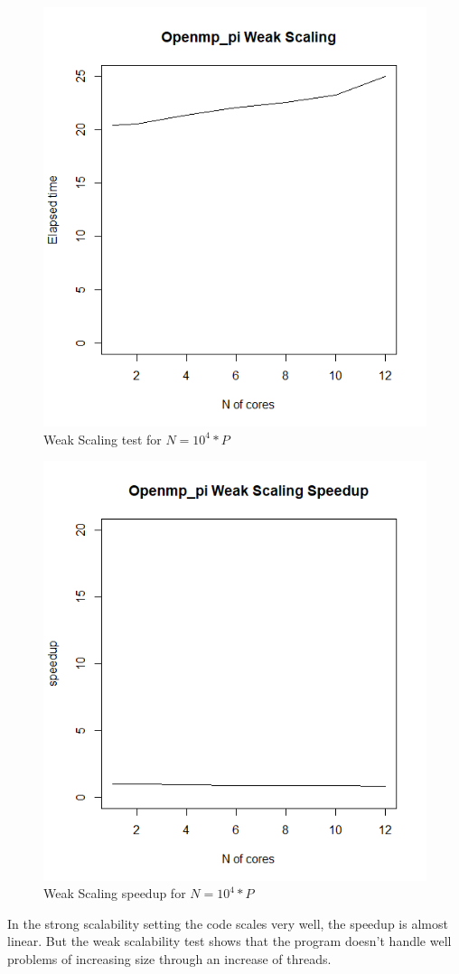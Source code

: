 \documentclass{article}
\begin{document}
\begin{figure}[H] %
	\centering
	\includegraphics[width=0.8\columnwidth]{graphs/openmp_pi_weakscaling} %
	\caption{Weak Scaling test for $N=10^4*P$}
\end{figure}

\begin{figure}[H] %
	\centering
	\includegraphics[width=0.8\columnwidth]{graphs/openmp_pi_weakscaling_speedup} %
	\caption{Weak Scaling speedup for $N=10^4*P$}
\end{figure}
In the strong scalability setting the code scales very well, the speedup is almost linear. But the weak scalability test shows that the program doesn't handle well problems of increasing size through an increase of threads.
\end{document}
